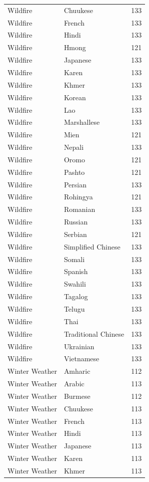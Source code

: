 \begin{longtable}{p{3cm} p{3cm} r}
Wildfire & Chuukese & 133 \\
Wildfire & French & 133 \\
Wildfire & Hindi & 133 \\
Wildfire & Hmong & 121 \\
Wildfire & Japanese & 133 \\
Wildfire & Karen & 133 \\
Wildfire & Khmer & 133 \\
Wildfire & Korean & 133 \\
Wildfire & Lao & 133 \\
Wildfire & Marshallese & 133 \\
Wildfire & Mien & 121 \\
Wildfire & Nepali & 133 \\
Wildfire & Oromo & 121 \\
Wildfire & Pashto & 121 \\
Wildfire & Persian & 133 \\
Wildfire & Rohingya & 121 \\
Wildfire & Romanian & 133 \\
Wildfire & Russian & 133 \\
Wildfire & Serbian & 121 \\
Wildfire & Simplified Chinese & 133 \\
Wildfire & Somali & 133 \\
Wildfire & Spanish & 133 \\
Wildfire & Swahili & 133 \\
Wildfire & Tagalog & 133 \\
Wildfire & Telugu & 133 \\
Wildfire & Thai & 133 \\
Wildfire & Traditional Chinese & 133 \\
Wildfire & Ukrainian & 133 \\
Wildfire & Vietnamese & 133 \\
Winter Weather & Amharic & 112 \\
Winter Weather & Arabic & 113 \\
Winter Weather & Burmese & 112 \\
Winter Weather & Chuukese & 113 \\
Winter Weather & French & 113 \\
Winter Weather & Hindi & 113 \\
Winter Weather & Japanese & 113 \\
Winter Weather & Karen & 113 \\
Winter Weather & Khmer & 113 \\

\end{longtable}
